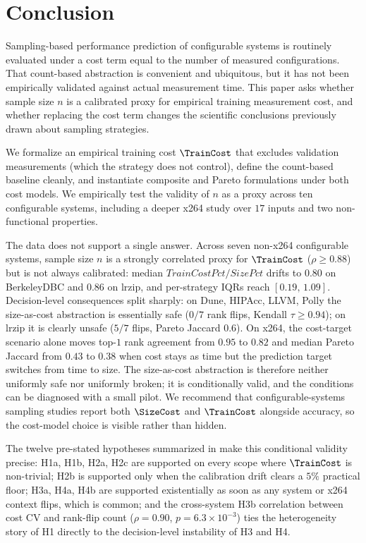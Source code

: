 \section{Conclusion}
\label{sec:conclusion}

Sampling-based performance prediction of configurable systems is routinely
evaluated under a cost term equal to the number of measured
configurations. That count-based abstraction is convenient and ubiquitous,
but it has not been empirically validated against actual measurement
time. This paper asks whether sample size $n$ is a calibrated proxy for
empirical training measurement cost, and whether replacing the cost term
changes the scientific conclusions previously drawn about sampling
strategies.

We formalize an empirical training cost $\TrainCost$ that excludes
validation measurements (which the strategy does not control), define the
count-based baseline cleanly, and instantiate composite and Pareto
formulations under both cost models. We empirically test the validity of
$n$ as a proxy across ten configurable systems, including a deeper x264
study over $17$ inputs and two non-functional properties.

The data does not support a single answer. Across seven non-x264
configurable systems, sample size $n$ is a strongly correlated proxy for
$\TrainCost$ ($\rho\geq 0.88$) but is not always calibrated: median
$\mathit{TrainCostPct}/\mathit{SizePct}$ drifts to $0.80$ on
BerkeleyDBC and $0.86$ on lrzip, and per-strategy IQRs reach
$[0.19,\,1.09]$. Decision-level consequences split sharply: on Dune,
HIPAcc, LLVM, Polly the size-as-cost abstraction is essentially safe
($0/7$ rank flips, Kendall $\tau\geq 0.94$); on lrzip it is clearly
unsafe ($5/7$ flips, Pareto Jaccard $0.6$). On x264, the cost-target
scenario alone moves top-$1$ rank agreement from $0.95$ to $0.82$ and
median Pareto Jaccard from $0.43$ to $0.38$ when cost stays as time but
the prediction target switches from time to size. The size-as-cost
abstraction is therefore neither uniformly safe nor uniformly broken; it
is conditionally valid, and the conditions can be diagnosed with a
small pilot. We recommend that configurable-systems sampling studies
report both $\SizeCost$ and $\TrainCost$ alongside accuracy, so the
cost-model choice is visible rather than hidden.

The twelve pre-stated hypotheses summarized in
 make this conditional validity precise:
H1a, H1b, H2a, H2c are supported on every scope where $\TrainCost$ is
non-trivial; H2b is supported only when the calibration drift clears a
$5\%$ practical floor; H3a, H4a, H4b are supported existentially as
soon as any system or x264 context flips, which is common; and the
cross-system H3b correlation between cost CV and rank-flip count
($\rho=0.90$, $p=6.3\!\times\!10^{-3}$) ties the heterogeneity story
of H1 directly to the decision-level instability of H3 and H4.

